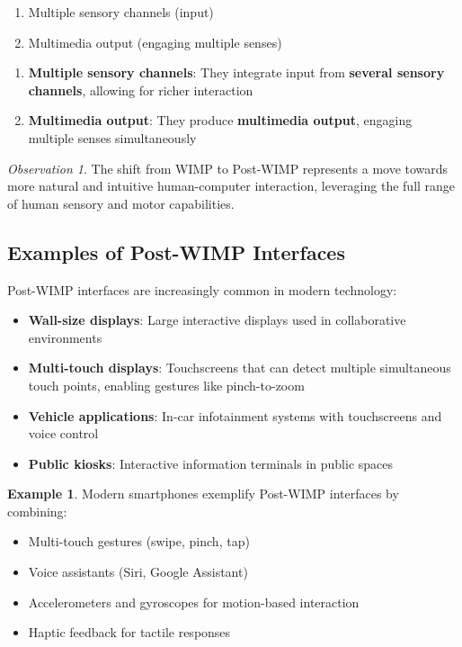 \documentclass[11pt,a4paper]{article}
\theoremstyle{definition}
\newtheorem{example}{Example}[section]
\theoremstyle{plain}
\theoremstyle{remark}
\newtheorem*{observation}{Observation}
\begin{document}
\begin{tcolorbox}[colback=green!5!white,colframe=green!75!black,title=\textbf{Key Characteristics of Post-WIMP}]
\begin{enumerate}
    \item Multiple sensory channels (input)
    \item Multimedia output (engaging multiple senses)
\end{enumerate}
\end{tcolorbox}

\begin{enumerate}
    \item \textbf{Multiple sensory channels}: They integrate input from \textbf{several sensory channels}, allowing for richer interaction
    \item \textbf{Multimedia output}: They produce \textbf{multimedia output}, engaging multiple senses simultaneously
\end{enumerate}

\begin{observation}
The shift from WIMP to Post-WIMP represents a move towards more natural and intuitive human-computer interaction, leveraging the full range of human sensory and motor capabilities.
\end{observation}

\subsection{Examples of Post-WIMP Interfaces}

Post-WIMP interfaces are increasingly common in modern technology:

\begin{itemize}
    \item \textbf{Wall-size displays}: Large interactive displays used in collaborative environments
    \item \textbf{Multi-touch displays}: Touchscreens that can detect multiple simultaneous touch points, enabling gestures like pinch-to-zoom
    \item \textbf{Vehicle applications}: In-car infotainment systems with touchscreens and voice control
    \item \textbf{Public kiosks}: Interactive information terminals in public spaces
\end{itemize}

\begin{example}
Modern smartphones exemplify Post-WIMP interfaces by combining:
\begin{itemize}
    \item Multi-touch gestures (swipe, pinch, tap)
    \item Voice assistants (Siri, Google Assistant)
    \item Accelerometers and gyroscopes for motion-based interaction
    \item Haptic feedback for tactile responses
\end{itemize}
\end{example}
\end{document}
